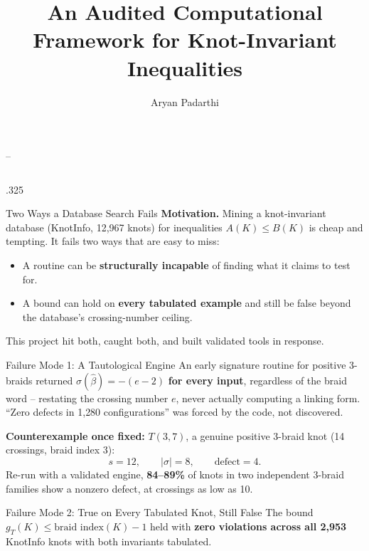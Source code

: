 \documentclass[final]{beamer}
\title{An Audited Computational Framework for Knot-Invariant Inequalities}
\author{Aryan Padarthi}
\institute{Independent Research}
\begin{document}
\begin{frame}[t]
\vspace{-1.3cm}
{\centering
\color{myblue}\VERYHuge\bfseries \inserttitle \par
\vspace{10pt}
\Large\insertauthor \quad--\quad \insertinstitute \par}
\vspace{0.6cm}

\begin{columns}[t, totalwidth=\textwidth]

\begin{column}{.325\linewidth}

\begin{block}{Two Ways a Database Search Fails}
\textbf{Motivation.} Mining a knot-invariant database (KnotInfo, 12{,}967 knots)
for inequalities $A(K)\le B(K)$ is cheap and tempting. It fails two ways
that are easy to miss:
\begin{itemize}
\item A routine can be \textbf{structurally incapable} of finding what
  it claims to test for.
\item A bound can hold on \textbf{every tabulated example} and still
  be false beyond the database's crossing-number ceiling.
\end{itemize}
This project hit both, caught both, and built validated tools in response.
\end{block}

\begin{block}{Failure Mode 1: A Tautological Engine}
An early signature routine for positive 3-braids returned
$\sigma(\hat\beta) = -(e-2)$ \textbf{for every input}, regardless of the
braid word -- restating the crossing number $e$, never actually computing
a linking form. ``Zero defects in 1{,}280 configurations'' was forced by
the code, not discovered.

\vspace{8pt}
\textbf{Counterexample once fixed:} $T(3,7)$, a genuine positive 3-braid
knot (14 crossings, braid index 3):
\[ s = 12, \qquad |\sigma| = 8, \qquad \text{defect} = 4. \]
Re-run with a validated engine, \textbf{84--89\%} of knots in two
independent 3-braid families show a nonzero defect, at crossings as low
as 10.
\end{block}

\begin{block}{Failure Mode 2: True on Every Tabulated Knot, Still False}
The bound $g_T(K) \le \text{braid index}(K) - 1$ held with
\textbf{zero violations across all 2{,}953} KnotInfo knots with both
invariants tabulated.


\end{block}
\end{column}
\end{columns}
\end{frame}
\end{document}
